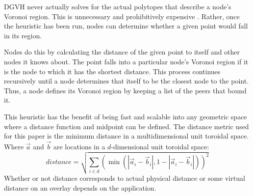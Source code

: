 

DGVH never actually solves for the actual polytopes that describe a node's Voronoi region.
This is unnecessary and prohibitively expensive \cite{raynet}.
Rather, once the heuristic has been run, nodes can determine whether a given point would fall in its region.

Nodes do this by calculating the distance of the given point to itself and other nodes it knows about.
The point falls into a particular node's Voronoi region if it is the node to which it has the shortest distance.
This process continues recursively until a node determines that itself to be the closest node to the point.
Thus, a node defines its Voronoi region by keeping a list of the peers that bound it.



This heuristic has the benefit of being fast and scalable into any geometric space where a distance function and midpoint can be defined.
The distance metric used for this paper is the minimum distance in a multidimensional unit toroidal space.
Where $\vec{a}$ and $\vec{b}$ are locations in a $d$-dimensional unit toroidal space:
\[ distance = \sqrt{\sum\limits_{i\in d} (\min(|\vec{a}_i-\vec{b}_i|, 1-|\vec{a}_i-\vec{b}_i|))^2}\]
Whether or not distance corresponds to actual physical distance or some virtual distance on an overlay depends on the application.


